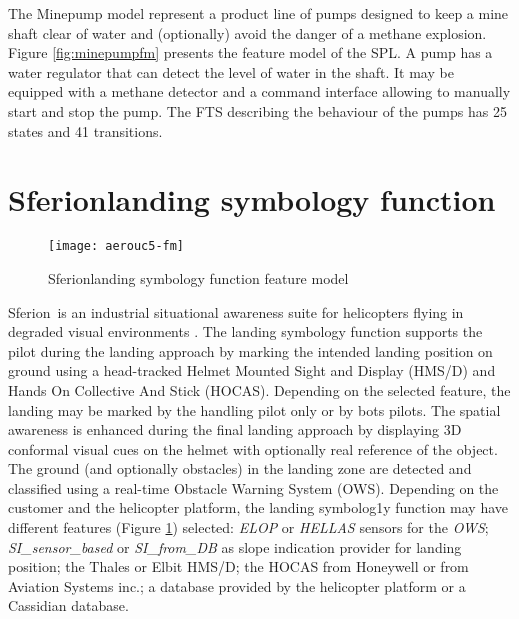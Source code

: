 The Minepump model \cite{Classen2010b} represent a product line of pumps designed to keep a mine shaft clear of water and (optionally) avoid the danger of a methane explosion. Figure \ref{fig:minepumpfm} presents the feature model of the SPL. A pump has a water regulator that can detect the level of water in the shaft. It may be equipped with a methane detector and a command interface allowing to manually start and stop the pump. The FTS describing the behaviour of the pumps has 25 states and 41 transitions. 


\section{Sferion\texttrademark landing symbology function}

\label{sec:casestudy:sferion}

\begin{figure}
	\centering
	\texttt{[image: aerouc5-fm]}
	\caption{Sferion\texttrademark landing symbology function feature model}
	\label{fig:aerouc5fm}
\end{figure}

Sferion\texttrademark ~is an industrial situational awareness suite for helicopters flying in degraded visual environments \cite{Devroey2015a,sferion,Samih2014c}. The landing symbology function supports the pilot during the landing approach by marking the intended landing position on ground using a head-tracked Helmet Mounted Sight and Display (HMS/D) and Hands On Collective And Stick (HOCAS). Depending on the selected feature, the landing may be marked by the handling pilot only or by bots pilots. The spatial awareness is enhanced during the final landing approach by displaying 3D conformal visual cues on the helmet with optionally real reference of the object. The ground (and optionally obstacles) in the landing zone are detected and classified using a real-time Obstacle Warning System (OWS). Depending on the customer and the helicopter platform, the landing symbolog1y function may have different features (Figure \ref{fig:aerouc5fm}) selected: \textit{ELOP} or \textit{HELLAS} sensors for the \textit{OWS}; \textit{SI\_sensor\_based} or \textit{SI\_from\_DB} as slope indication provider for landing position; the Thales or Elbit HMS/D; the HOCAS from Honeywell or from Aviation Systems inc.; a database provided by the helicopter platform or a Cassidian database.

